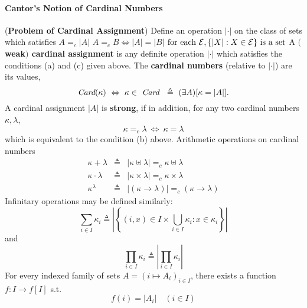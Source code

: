 \documentclass{myproc}
\begin{document}
\paragraph{Cantor's Notion of Cardinal Numbers}
\bit
\w ({\bf{}Problem of Cardinal Assignment})
	Define an operation $|{\cdot}|$ on the class of sets which satisfies
		\bit
		\w [(a)] $A =_c |A|$
		\w [(b)] $A =_c B \Leftrightarrow |A| = |B|$
		\w [(c)] $\mbox{for each ${\cal{}E}, 
			\{|X|: X \in {\cal{}E}\}$ is a set}$
		\eit
\w A {\bf{}$($weak$)$ cardinal assignment} is any definite operation
	$|{\cdot}|$ which satisfies the conditions (a) and (c) given above.
	The {\bf{}cardinal numbers} (relative to $|{\cdot}|$) are its values,
		\[ \mbox{\em{}Card}(\kappa)\ \Leftrightarrow\ 
			\kappa \in \mbox{\ \em{}Card}\
			\ \triangleq\ (\exists{A})[\kappa = |A|]. \]
	A cardinal assignment $|A|$ is {\bf{}strong}, if in addition, 
		for any two cardinal numbers $\kappa, \lambda$,
			\[ \kappa =_c \lambda \ \Leftrightarrow\ \kappa = \lambda\]
		which is equivalent to the condition (b) above.
\w Arithmetic operations on cardinal numbers
	\begin{eqnarray*}
	\kappa + \lambda & \triangleq & |\kappa \uplus \lambda| =_c 
		\kappa \uplus \lambda\\
	\kappa \cdot \lambda & \triangleq & |\kappa \times \lambda| =_c 
		\kappa \times \lambda\\
	\kappa^\lambda & \triangleq & |(\kappa \rightarrow \lambda)| =_c 
		(\kappa \rightarrow \lambda)
	\end{eqnarray*}
	\bit
	\w Infinitary operations may be defined similarly:
	\[\sum_{i \in I}\kappa_i  \triangleq 
		\left|\left\{(i, x) \in I \times\bigcup_{i \in I}\kappa_i: x 
			\in \kappa_i\right\}\right|\]
			and
			\[
		\prod_{i \in I}\kappa_i  \triangleq 
			\left|\prod_{i\in I}\kappa_i\right|\]
	\eit
\w For every indexed family of sets $A = (i \mapsto A_i)_{i \in I}$,
	there exists a function $f: I \rightarrow f[I]$ s.t.
		\[ f(i) = |A_i| \quad (i \in I)\]
\eit
\end{document}

